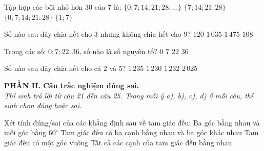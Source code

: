 \begin{ex}%
	Tập hợp các bội nhỏ hơn $30$ của $7$ là:
	\choice
	{$\{0; 7; 14; 21; 28; \dots\}$}
	{$\{7; 14; 21; 28\}$}
	{\True $\{0; 7; 14; 21; 28\}$}
	{$\{1; 7\}$}
\end{ex}

\begin{ex}%
	Số nào sau đây chia hết cho $3$ nhưng không chia hết cho $9$?
	\choice
	{\True $120$}
	{$1\,035$}
	{$1\,475$}
	{$108$}
\end{ex}

\begin{ex}%
	Trong các số: $0; 7; 22; 36$, số nào là số nguyên tố?
	\choice
	{$0$}
	{\True $7$}
	{$22$}
	{$36$}
\end{ex}

\begin{ex}%
	Số nào sau đây chia hết cho cả $2$ và $5$?
	\choice
	{$1\,235$}
	{\True $1\,230$}
	{$1\,232$}
	{$2\,025$}
\end{ex}
\vspace{2pt}

\noindent\textbf{PHẦN II. Câu trắc nghiệm đúng sai.}\\
\textit{Thí sinh trả lời từ câu 21 đến câu 25. Trong mỗi ý a), b), c), d) ở mỗi câu, thí sinh chọn đúng hoặc sai.}

\begin{ex}%
	Xét tính đúng/sai của các khẳng định sau về tam giác đều:
	\choiceTF
	{\True Ba góc bằng nhau và mỗi góc bằng $60^\circ$}
	{Tam giác đều có ba cạnh bằng nhau và ba góc khác nhau}
	{Tam giác đều có một góc vuông}
	{\True Tất cả các cạnh của tam giác đều bằng nhau}
\end{ex}

